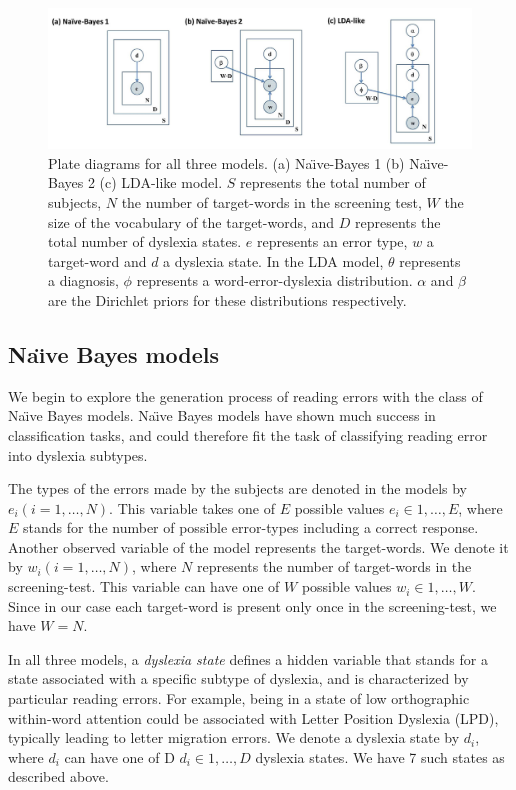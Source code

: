 {\begin{figure}
\vspace{.3in}
\includegraphics[width=\textwidth]{Figures/Ch1/figure_graphical_models}
\caption{Plate diagrams for all three models. (a) Na\"{\i}ve-Bayes 1 (b) Na\"{\i}ve-Bayes 2 (c) LDA-like model. $S$ represents the total number of subjects, $N$ the number of target-words in the screening test, $W$ the size of the vocabulary of the target-words, and $D$ represents the total number of dyslexia states. $e$ represents an error type, $w$ a target-word and $d$ a dyslexia state. In the LDA model, $\theta$ represents a diagnosis, $\phi$ represents a word-error-dyslexia distribution. $\alpha$ and $\beta$ are the Dirichlet priors for these distributions respectively.}
\end{figure}

\subsection{Na\"{\i}ve Bayes models}
We begin to explore the generation process of reading errors with the class of Na\"{\i}ve Bayes models. Na\"{\i}ve Bayes models have shown much success in classification tasks, and could therefore fit the task of classifying reading error into dyslexia subtypes. 

The types of the errors made by the subjects are denoted in the models by $ e_i (i = 1, \dots , N) $. This variable takes one of $E$ possible values $ e_i \in {1, \dots , E} $, where $E$ stands for the number of possible error-types including a correct response. Another observed variable of the model represents the target-words. We denote it by $ w_i (i = 1, \dots , N) $, where $N$ represents the number of target-words in the screening-test. This variable can have one of $W$ possible values $ w_i \in {1, \dots , W} $. Since in our case each target-word is present only once in the screening-test, we have $ W = N $.

In all three models, a {\it dyslexia state} defines a hidden variable that stands for a state associated with a specific subtype of dyslexia, and is characterized by particular reading errors. For example, being in a state of low orthographic within-word attention could be associated with Letter Position Dyslexia (LPD), typically leading to letter migration errors. We denote a dyslexia state by $d_i$, where $d_i$ can have one of D $ d_i \in {1, \dots ,D} $ dyslexia states. We have 7 such states as described above.

}
